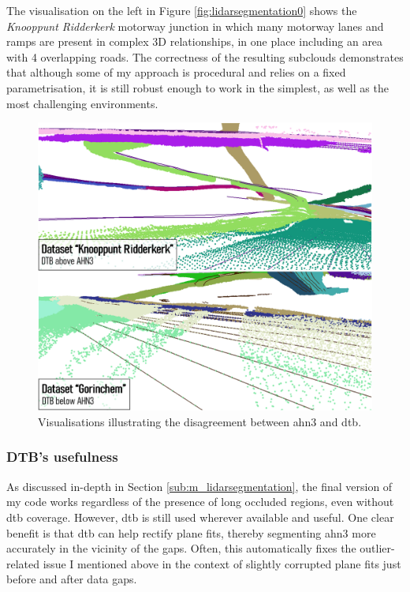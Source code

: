 The visualisation on the left in Figure \ref{fig:lidarsegmentation0} shows the \textit{Knooppunt Ridderkerk} motorway junction in which many motorway lanes and ramps are present in complex 3D relationships, in one place including an area with 4 overlapping roads. The correctness of the resulting subclouds demonstrates that although some of my approach is procedural and relies on a fixed parametrisation, it is still robust enough to work in the simplest, as well as the most challenging environments.

\begin{figure}[h]
    \centering
    \includegraphics[width=0.9\linewidth]{final_report/figs/lidarsegmentation1.png}
    \caption{Visualisations illustrating the disagreement between \ac{ahn3} and \ac{dtb}.}
    \label{fig:lidarsegmentation1}
\end{figure}

\subsubsection{DTB's usefulness}

As discussed in-depth in Section \ref{sub:m_lidarsegmentation}, the final version of my code works regardless of the presence of long occluded regions, even without \ac{dtb} coverage. However, \ac{dtb} is still used wherever available and useful. One clear benefit is that \ac{dtb} can help rectify plane fits, thereby segmenting \ac{ahn3} more accurately in the vicinity of the gaps. Often, this automatically fixes the outlier-related issue I mentioned above in the context of slightly corrupted plane fits just before and after data gaps.

